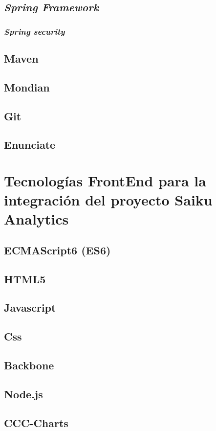 \begin{spacing}{1.5}
	\subsection{\textit{Spring Framework}}
			\lipsum[1-2]
		\subsubsection{\textit{Spring security}}
				\lipsum[1-2]
	\subsection{Maven}
			\lipsum[1-2]
	\subsection{Mondian}
			\lipsum[1-2]
	\subsection{Git}
			\lipsum[1-2]
	\subsection{Enunciate}
			\lipsum[1-2]
\section{Tecnolog\'{i}as FrontEnd para la integraci\'{o}n
		 del proyecto Saiku Analytics}
		\lipsum[1-2]
	\subsection{ECMAScript6 (ES6)}
			\lipsum[1-2]
	\subsection{HTML5}
			\lipsum[1-2]
	\subsection{Javascript}
			\lipsum[1-2]
	\subsection{Css}
			\lipsum[1-2]
	\subsection{Backbone}
			\lipsum[1-2]
	\subsection{Node.js}
			\lipsum[1-2]
	\subsection{CCC-Charts}
			\lipsum[1-2]
\end{spacing}
		

